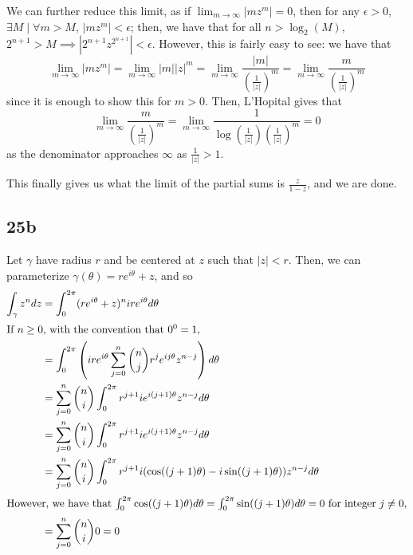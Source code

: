 \documentclass[12pt,letterpaper]{article}
\theoremstyle{definition}
\begin{document}
We can further reduce this limit, as if $\lim_{m \rightarrow \infty}|mz^{m}| = 0$, then for any $\epsilon > 0$, $\exists M \mid \forall m > M$, $|mz^{m}| < \epsilon$; then, we have that for all $n > \log_{2}(M)$, $2^{n+1} > M \implies |2^{n+1}z^{2^{n+1}}| < \epsilon$. However, this is fairly easy to see: we have that
\[
  \lim_{m \rightarrow \infty}|mz^{m}| = \lim_{m \rightarrow \infty}|m||z|^{m} = \lim_{m \rightarrow \infty} \frac{|m|}{\left(\frac{1}{|z|}\right)^{m}} = \lim_{m \rightarrow \infty} \frac{m}{\left(\frac{1}{|z|}\right)^{m}}
\]
since it is enough to show this for $m > 0$. Then, L'Hopital gives that
\[
  \lim_{m \rightarrow \infty} \frac{m}{\left(\frac{1}{|z|}\right)^{m}} = \lim_{m \rightarrow \infty}\frac{1}{\log(\frac{1}{|z|})(\frac{1}{|z|})^{m}} = 0
\]
as the denominator approaches $\infty$ as $\frac{1}{|z|} > 1$.

This finally gives us what the limit of the partial sums is $\frac{z}{1-z}$, and we are done.

\subsection*{25b}


Let $\gamma$ have radius $r$ and be centered at $z$ such that $|z| < r$. Then, we can parameterize $\gamma(\theta) = re^{i\theta} + z$, and so
\begin{align*}
  \int_{\gamma}z^{n}dz &= \int_{0}^{2\pi}(re^{i\theta} + z)^{n}ire^{i\theta}d\theta \\
  \intertext{If $n \geq 0$, with the convention that $0^{0} = 1$,}
                       &= \int_{0}^{2\pi}\left(ire^{i\theta}\sum_{j=0}^{n}\binom{n}{j}r^{j}e^{ij\theta}z^{n-j}\right)d\theta \\
                       &= \sum_{j=0}^{n}\binom{n}{i}\int_{0}^{2\pi}r^{j+1}ie^{i(j+1)\theta}z^{n-j}d\theta \\
                       &= \sum_{j=0}^{n}\binom{n}{i}\int_{0}^{2\pi}r^{j+1}ie^{i(j+1)\theta}z^{n-j}d\theta \\
                       &= \sum_{j=0}^{n}\binom{n}{i}\int_{0}^{2\pi}r^{j+1}i(\cos((j+1)\theta) - i\sin((j+1)\theta))z^{n-j}d\theta \\
  \intertext{However, we have that $\int_{0}^{2\pi}\cos((j+1)\theta)d\theta = \int_{0}^{2\pi}\sin((j+1)\theta)d\theta = 0$ for integer $j \neq 0$,}
                       &= \sum_{j=0}^{n}\binom{n}{i} 0 = 0
\end{align*}
\end{document}
